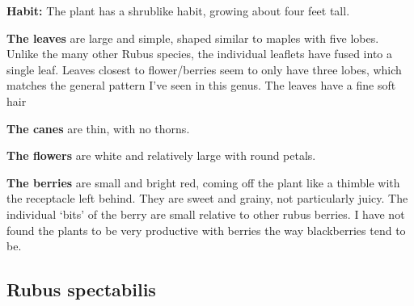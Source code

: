 \textbf{Habit:} The plant has a shrublike habit, growing about four feet tall. 

\textbf{The leaves} are large and simple, shaped similar to maples with five lobes. Unlike the many other Rubus species, the individual leaflets have fused into a single leaf. Leaves closest to flower/berries seem to only have three lobes, which matches the general pattern I've seen in this genus. The leaves have a fine soft hair

\textbf{The canes} are thin, with no thorns.

\textbf{The flowers} are white and relatively large with round petals.

\textbf{The berries} are small and bright red, coming off the plant like a thimble with the receptacle left behind. They are sweet and grainy, not particularly juicy. The individual `bits' of the berry are small relative to other rubus berries. I have not found the plants to be very productive with berries the way blackberries tend to be.


\subsection{Rubus spectabilis}

